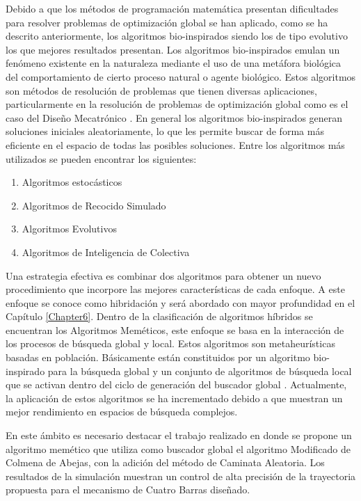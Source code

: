   Debido a que los métodos de programación matemática presentan dificultades para resolver problemas de optimización global se han aplicado, como se ha descrito anteriormente, los algoritmos bio-inspirados siendo los de tipo evolutivo los que mejores resultados presentan. Los algoritmos bio-inspirados emulan un fenómeno existente en la naturaleza mediante el uso de una metáfora biológica del comportamiento de cierto proceso natural o agente biológico. Estos algoritmos son métodos de resolución de problemas que tienen diversas  aplicaciones, particularmente en la resolución de problemas de optimización global como es el caso del Diseño Mecatrónico \cite{yang_swarm_2013}. En general los algoritmos bio-inspirados generan soluciones iniciales aleatoriamente, lo que les permite buscar de forma más eficiente en el espacio de todas las posibles soluciones. Entre los algoritmos más utilizados se pueden encontrar los siguientes:

  \begin{enumerate}
  	\item Algoritmos estocásticos 
  	\item Algoritmos de Recocido Simulado 
  	\item Algoritmos Evolutivos 
  	\item Algoritmos de Inteligencia de Colectiva
  \end{enumerate}

Una estrategia efectiva es combinar dos algoritmos para obtener un nuevo procedimiento que incorpore las mejores características de cada enfoque. A este enfoque se conoce como hibridación y será abordado con mayor profundidad en el Capítulo \ref{Chapter6}. Dentro de la clasificación de algoritmos híbridos se encuentran los Algoritmos Meméticos, este enfoque se basa en la interacción de los procesos de búsqueda global y local. Estos algoritmos son metaheurísticas basadas en población. Básicamente están constituidos por un algoritmo bio-inspirado para la búsqueda global y un conjunto de algoritmos de búsqueda local que se activan dentro del ciclo de generación del buscador global \cite{ferrante_handbook_2012}. Actualmente, la aplicación de estos algoritmos se ha incrementado debido a que muestran un mejor rendimiento en espacios de búsqueda complejos. 

En este ámbito es necesario destacar el trabajo 
realizado en \cite{VegaMEC1} donde se propone un algoritmo memético que utiliza como buscador global el algoritmo Modificado de Colmena de Abejas, con la adición del método de Caminata Aleatoria. Los resultados de la simulación muestran un control de alta precisión de la trayectoria propuesta para el mecanismo de Cuatro Barras diseñado.

